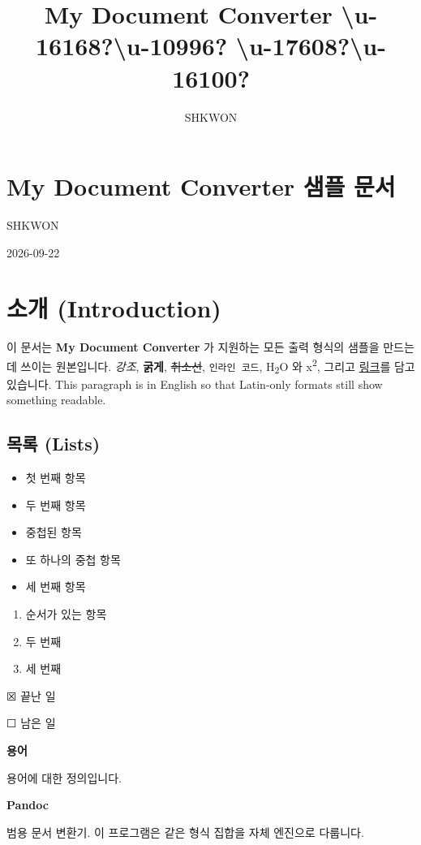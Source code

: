 \documentclass[11pt]{article}
\title{My Document Converter \textbackslash{}u-16168?\textbackslash{}u-10996? \textbackslash{}u-17608?\textbackslash{}u-16100?}
\author{SHKWON}
\date{}
\begin{document}
\maketitle

\section*{My Document Converter 샘플 문서}\label{my-document-converter-샘플-문서}

SHKWON

2026-09-22

\section*{소개 (Introduction)}\label{소개-introduction}

이 문서는 \textbf{My Document Converter} 가 지원하는 모든 출력 형식의 샘플을 만드는 데 쓰이는
원본입니다. \emph{강조}, \textbf{굵게}, \sout{취소선}, \verb|인라인 코드|,
H\textsubscript{2}O 와 x\textsuperscript{2}, 그리고 \underline{링크}를 담고 있습니다.
This paragraph is in English so that Latin-only formats still show
something readable.

\subsection*{목록 (Lists)}\label{목록-lists}

\begin{itemize}
\item 첫 번째 항목
\item 두 번째 항목
\item 중첩된 항목
\item 또 하나의 중첩 항목
\item 세 번째 항목
\end{itemize}

\begin{enumerate}
\item 순서가 있는 항목
\item 두 번째
\item 세 번째
\end{enumerate}

☒	끝난 일

☐	남은 일

\textbf{용어}

용어에 대한 정의입니다.

\textbf{Pandoc}

범용 문서 변환기. 이 프로그램은 같은 형식 집합을 자체 엔진으로 다룹니다.
\end{document}

